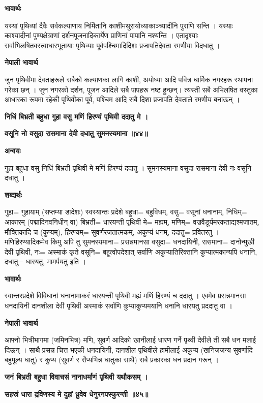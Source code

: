 \documentclass[11pt, a5paper]{article}
\begin{document}
\textbf{भावार्थः}

यस्यां पृथिव्यां दैवैः सर्वकल्याणाय निर्मितानि काशीमथुरायोध्याकाञ्च्यादीनि पुराणि सन्ति । यस्याः काश्यादीनां पुण्यक्षेत्राणां दर्शनपूजनादिकार्येण प्राणिनां पापानि नश्यन्ति । एतादृश्याः सर्वाभिलषितवस्त्वाधारभूतायाः पृथिव्याः  पूर्वपश्चिमादिदिशः प्रजापतिदेवता रमणीया विदधातु ।

\textbf{नेपाली भावार्थ}

जुन पृथिवीमा देवताहरूले सबैको कल्याणका लागि काशी, अयोध्या आदि पवित्र धार्मिक नगरहरू स्थापना गरेका छन् । जुन नगरको दर्शन, पूजन आदिले सबै पापहरू नष्ट हुन्छन्। त्यस्ती सबै अभिलषित वस्तुका आधारका रूपमा रहेकी पृथिवीका पूर्व, पश्चिम आदि सबै दिशा प्रजापति देवताले रमणीय बनाऊन् ।

\textbf{निधिं बिभ्रती बहुधा गुहा वसु मणिं हिरण्यं पृथिवी ददातु मे ।}

\textbf{वसूनि नो वसुदा रासमाना देवी दधातु सुमनस्यमाना ॥४४॥}

\textbf{अन्वयः}

गुहा बहुधा वसु निधिं बिभ्रती पृथिवी मे मणिं हिरण्यं ददातु । सुमनस्यमाना वसुदा रासमाना देवी नः वसूनि दधातु ।

\textbf{शब्दार्थः}

गुहा= गुहायाम् (सप्तम्या डादेशः) स्वस्यान्तः प्रदेशे बहुधा= बहुविधम्, वसु= वसूनां धनानाम्, निधिम्= आकारम् (पद्मादिनवनिधीन् वा) बिभ्रती= धारयन्ती पृथिवी मे= मह्यम्, मणिम्= वज्रवैडूर्यमरकताद्यश्मजातम्, मौक्तिकादि च (कुप्यम्), हिरण्यम्= सुवर्णरजतात्मकम्, अकुप्यं धनम्, ददातु= प्रवितरतु । मणिहिरण्यादिकमेव किमु अपि तु सुमनस्यमाना= प्रसन्नमानसा वसुदा= धनदायिनी, रासमाना= दानोन्मुखी देवी पृथिवी, नः= अस्माकं कृते वसूनि= बहूत्वोपदेशात् सर्वाणि अकुप्यातिरिक्तानि कुप्यात्मकान्यपि धनानि, दधातु= धारयतु, मामर्पयतु इति ।

\textbf{भावार्थः}

स्वान्तरप्रदेशे विविधानां धनानामाकरं धारयन्ती पृथिवी मह्यं मणिं हिरण्यं च ददातु । एवमेव प्रसन्नमानसा धनदायिनी दानशीला देवी पृथिवी अस्माकं सर्वाणि कुप्याकुप्यमयानि धनानि धारयतु प्रददातु वा ।

\textbf{नेपाली भावार्थ}

आफ्नो भित्रीभागमा (जमिनभित्र) मणि, सुवर्ण आदिको खानीलाई धारण गर्ने पृथ्वी देवीले ती सबै धन मलाई दिऊन् । साथै प्रसन्न चित्त भएकी धनदायिनी, दानशील पृथिवीले हामीलाई अकुप्य (खनिजजन्य सुवर्णादि बहुमूल्य धातु) र कुप्य (सुवर्ण र रौप्यभिन्न धातुका साथै) सबै प्रकारका धन प्रदान गरून् ।

\textbf{जनं बिभ्रती बहुधा विवाचसं नानाधर्माणं पृथिवी यथौकसम् ।}

\textbf{सहस्रं धारा द्रविणस्य मे दुहां ध्रुवेव धेनुरनपस्फुरन्ती ॥४५॥}
\end{document}
